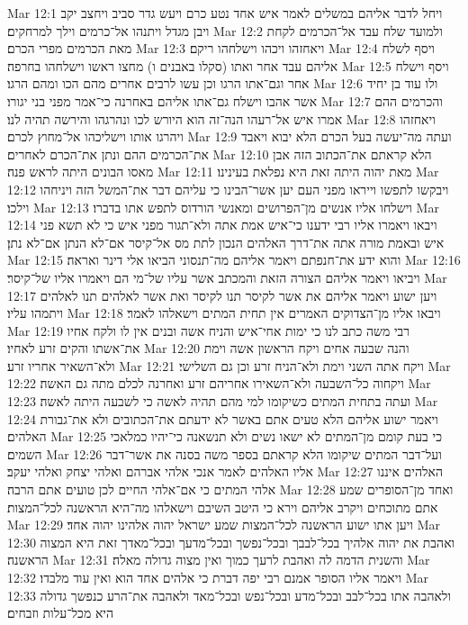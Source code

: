 Mar 12:1  ויחל לדבר אליהם במשלים לאמר איש אחד נטע כרם ויעש גדר סביב ויחצב יקב ויבן מגדל ויתנהו אל־כרמים וילך למרחקים׃
Mar 12:2  ולמועד שלח עבד אל־הכרמים לקחת מאת הכרמים מפרי הכרם׃
Mar 12:3  ויאחזהו ויכהו וישלחהו ריקם׃
Mar 12:4  ויסף לשלח אליהם עבד אחר ואתו (סקלו באבנים ו) מחצו ראשו וישלחהו בחרפה׃
Mar 12:5  ויסף וישלח אחר וגם־אתו הרגו וכן עשו לרבים אחרים מהם הכו ומהם הרגו׃
Mar 12:6  ולו עוד בן יחיד אשר אהבו וישלח גם־אתו אליהם באחרנה כי־אמר מפני בני יגורו׃
Mar 12:7  והכרמים ההם אמרו איש אל־רעהו הנה־זה הוא היורש לכו ונהרגהו והירשה תהיה לנו׃
Mar 12:8  ויאחזהו ויהרגו אותו וישליכהו אל־מחוץ לכרם׃
Mar 12:9  ועתה מה־יעשה בעל הכרם הלא יבוא ויאבד את־הכרמים ההם ונתן את־הכרם לאחרים׃
Mar 12:10  הלא קראתם את־הכתוב הזה אבן מאסו הבונים היתה לראש פנה׃
Mar 12:11  מאת יהוה היתה זאת היא נפלאת בעינינו׃
Mar 12:12  ויבקשו לתפשו וייראו מפני העם יען אשר־הבינו כי עליהם דבר את־המשל הזה ויניחהו וילכו׃
Mar 12:13  וישלחו אליו אנשים מן־הפרושים ומאנשי הורדוס לתפש אתו בדברו׃
Mar 12:14  ויבאו ויאמרו אליו רבי ידענו כי־איש אמת אתה ולא־תגור מפני איש כי לא תשא פני איש ובאמת מורה אתה את־דרך האלהים הנכון לתת מס אל־קיסר אם־לא הנתן אם־לא נתן׃
Mar 12:15  והוא ידע את־חנפתם ויאמר אליהם מה־תנסוני הביאו אלי דינר ואראה׃
Mar 12:16  ויביאו ויאמר אליהם הצורה הזאת והמכתב אשר עליו של־מי הם ויאמרו אליו של־קיסר׃
Mar 12:17  ויען ישוע ויאמר אליהם את אשר לקיסר תנו לקיסר ואת אשר לאלהים תנו לאלהים ויתמהו עליו׃
Mar 12:18  ויבאו אליו מן־הצדוקים האמרים אין תחית המתים וישאלהו לאמר׃
Mar 12:19  רבי משה כתב לנו כי ימות אחי־איש והניח אשה ובנים אין לו ולקח אחיו את־אשתו והקים זרע לאחיו׃
Mar 12:20  והנה שבעה אחים ויקח הראשון אשה וימת ולא־השאיר אחריו זרע׃
Mar 12:21  ויקח אתה השני וימת ולא־הניח זרע וכן גם השלישי׃
Mar 12:22  ויקחוה כל־השבעה ולא־השאירו אחריהם זרע ואחרנה לכלם מתה גם האשה׃
Mar 12:23  ועתה בתחית המתים כשיקומו למי מהם תהיה לאשה כי לשבעה היתה לאשה׃
Mar 12:24  ויאמר ישוע אליהם הלא טעים אתם באשר לא ידעתם את־הכתובים ולא את־גבורת האלהים׃
Mar 12:25  כי בעת קומם מן־המתים לא ישאו נשים ולא תנשאנה כי־יהיו כמלאכי השמים׃
Mar 12:26  ועל־דבר המתים שיקומו הלא קראתם בספר משה בסנה את אשר־דבר אליו האלהים לאמר אנכי אלהי אברהם ואלהי יצחק ואלהי יעקב׃
Mar 12:27  האלהים איננו אלהי המתים כי אם־אלהי החיים לכן טועים אתם הרבה׃
Mar 12:28  ואחד מן־הסופרים שמע אתם מתוכחים ויקרב אליהם וירא כי היטב השיבם וישאלהו מה־היא הראשנה לכל־המצות׃
Mar 12:29  ויען אתו ישוע הראשנה לכל־המצות שמע ישראל יהוה אלהינו יהוה אחד׃
Mar 12:30  ואהבת את יהוה אלהיך בכל־לבבך ובכל־נפשך ובכל־מדעך ובכל־מאדך זאת היא המצוה הראשנה׃
Mar 12:31  והשנית הדמה לה ואהבת לרעך כמוך ואין מצוה גדולה מאלה׃
Mar 12:32  ויאמר אליו הסופר אמנם רבי יפה דברת כי אלהים אחד הוא ואין עוד מלבדו׃
Mar 12:33  ולאהבה אתו בכל־לבב ובכל־מדע ובכל־נפש ובכל־מאד ולאהבה את־הרע כנפשך גדולה היא מכל־עלות וזבחים׃
